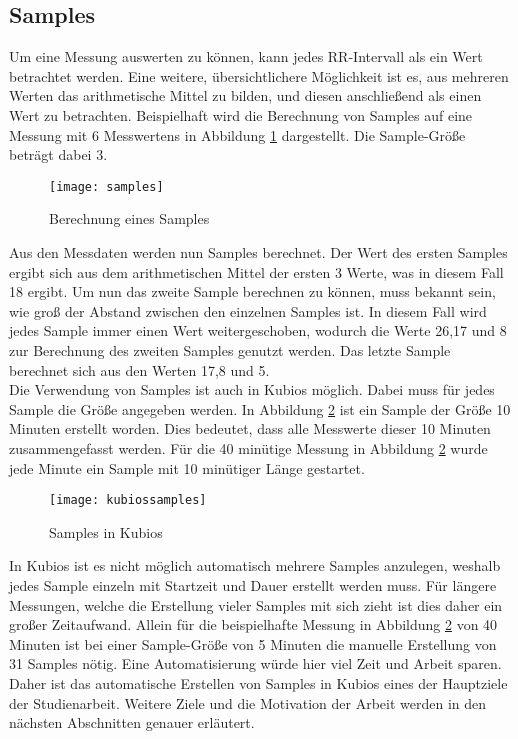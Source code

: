 \subsection{Samples}
Um eine Messung auswerten zu können, kann jedes RR-Intervall als ein Wert betrachtet werden. Eine weitere, übersichtlichere Möglichkeit ist es, aus mehreren Werten das arithmetische Mittel zu bilden, und diesen anschließend als einen Wert zu betrachten. Beispielhaft wird die Berechnung von Samples auf eine Messung mit 6 Messwertens in Abbildung \ref{fig:samples} dargestellt. Die Sample-Größe beträgt dabei 3.
 \begin{figure}[H]
	\centering
	\texttt{[image: samples]}
	\caption{Berechnung eines Samples}
	\label{fig:samples}
\end{figure}
Aus den Messdaten werden nun Samples berechnet. Der Wert des ersten Samples ergibt sich aus dem arithmetischen Mittel der ersten 3 Werte, was in diesem Fall 18 ergibt. Um nun das zweite Sample berechnen zu können, muss bekannt sein, wie groß der Abstand zwischen den einzelnen Samples ist. In diesem Fall wird jedes Sample immer einen Wert weitergeschoben, wodurch die Werte 26,17 und 8 zur Berechnung des zweiten Samples genutzt werden. Das letzte Sample berechnet sich aus den Werten 17,8 und 5.\\

Die Verwendung von Samples ist auch in Kubios möglich. Dabei muss für jedes Sample  die Größe angegeben werden. In Abbildung \ref{fig:kubiossamples} ist ein Sample der Größe 10 Minuten erstellt worden. Dies bedeutet, dass alle Messwerte dieser 10 Minuten zusammengefasst werden. Für die 40 minütige Messung in Abbildung \ref{fig:kubiossamples} wurde jede Minute ein Sample mit 10 minütiger Länge gestartet.\\

 \begin{figure}[H]
	\centering
	\texttt{[image: kubiossamples]}
	\caption{Samples in Kubios}
	\label{fig:kubiossamples}
\end{figure}

In Kubios ist es nicht möglich automatisch mehrere Samples anzulegen, weshalb jedes Sample einzeln mit Startzeit und Dauer erstellt werden muss. Für längere Messungen, welche die Erstellung vieler Samples mit sich zieht ist dies daher ein großer Zeitaufwand. Allein für die beispielhafte Messung in Abbildung \ref{fig:kubiossamples} von 40 Minuten ist bei einer Sample-Größe von 5 Minuten die manuelle Erstellung von 31 Samples nötig. Eine Automatisierung würde hier viel Zeit und Arbeit sparen. Daher ist das automatische Erstellen von Samples in Kubios eines der Hauptziele der Studienarbeit. Weitere Ziele und die Motivation der Arbeit werden in den nächsten Abschnitten genauer erläutert.
